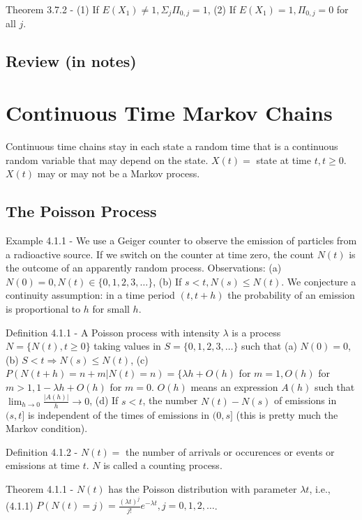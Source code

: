 \documentclass{article}
\begin{document}
Theorem 3.7.2 - (1) If $E(X_1) \ne 1, \Sigma_j \Pi_{0, j} = 1$, (2) If $E(X_1) = 1, \Pi_{0, j} = 0$ for all $j$.

\subsection{Review (in notes)}

\section{Continuous Time Markov Chains}

Continuous time chains stay in each state a random time that is a continuous random variable that may depend on the state. $X(t) =$ state at time $t, t \ge 0$. $X(t)$ may or may not be a Markov process.

\subsection{The Poisson Process}

Example 4.1.1 - We use a Geiger counter to observe the emission of particles from a radioactive source. If we switch on the counter at time zero, the count $N(t)$ is the outcome of an apparently random process. Observations: (a) $N(0) = 0, N(t) \in \{0, 1, 2, 3, \dots\}$, (b) If $s < t, N(s) \le N(t)$. We conjecture a continuity assumption: in a time period $(t, t + h)$ the probability of an emission is proportional to $h$ for small $h$.

Definition 4.1.1 - A Poisson process with intensity $\lambda$ is a process $N = \{N(t), t \ge 0\}$ taking values in $S = \{0, 1, 2, 3, \dots\}$ such that (a) $N(0) = 0$, (b) $S < t \Rightarrow N(s) \le N(t)$, (c) $P(N(t + h) = n + m | N(t) = n) = \{\lambda h + O(h)$ for $m = 1, O(h)$ for $m > 1, 1 - \lambda h + O(h)$ for $m = 0$. $O(h)$ means an expression $A(h)$ such that $\lim_{h \rightarrow 0} \frac{|A(h)|}{h} \rightarrow 0$, (d) If $s < t$, the number $N(t) - N(s)$ of emissions in $(s, t]$ is independent of the times of emissions in $(0, s]$ (this is pretty much the Markov condition).

Definition 4.1.2 - $N(t) =$ the number of arrivals or occurences or events or emissions at time $t$. $N$ is called a counting process.

Theorem 4.1.1 - $N(t)$ has the Poisson distribution with parameter $\lambda t$, i.e., (4.1.1) $P(N(t) = j) = \frac{(\lambda t)^j}{j!} e^{-\lambda t}, j = 0, 1, 2, \dots$.
\end{document}

